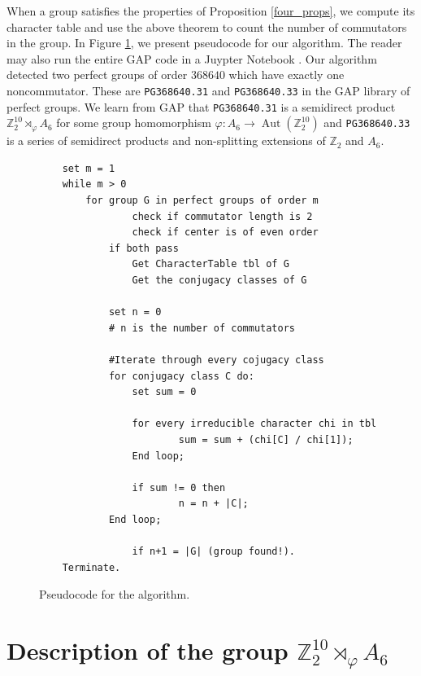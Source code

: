 \documentclass[10pt,leqno]{amsart}
\DeclareMathOperator{\Aut}{Aut}
\newcommand{\Z}{\mathbb{Z}}
\begin{document}
When a group satisfies the properties of Proposition \ref{four_props}, we compute its character table and use the above theorem to count the number of commutators in the group. In Figure \ref{fig:pseudocode}, we present pseudocode for our algorithm. The reader may also run the entire GAP code in a Juypter Notebook \cite{mycode}. Our algorithm detected two perfect groups of order $368640$ which have exactly one noncommutator. These are \verb|PG368640.31| and \verb|PG368640.33| in the GAP library of perfect groups. We learn from GAP that \verb|PG368640.31| is a semidirect product $\mathbb{Z}_2^{10} \rtimes_\varphi A_6$ for some group homomorphism $\varphi:A_6\to \Aut(\Z_2^{10})$ and \verb|PG368640.33| is a series of semidirect products and non-splitting extensions of $\Z_2$ and $A_6$.   
\begin{figure}
\begin{tcolorbox}[colback=white, colframe=black!60, title=Pseudocode for the search algorithm]
    \begin{verbatim}
    set m = 1
    while m > 0
        for group G in perfect groups of order m
                check if commutator length is 2
                check if center is of even order
            if both pass 
                Get CharacterTable tbl of G 
                Get the conjugacy classes of G
    
            set n = 0
            # n is the number of commutators
                    
            #Iterate through every cojugacy class
            for conjugacy class C do:
                set sum = 0
                
                for every irreducible character chi in tbl
                        sum = sum + (chi[C] / chi[1]);
                End loop;
    
                if sum != 0 then
                        n = n + |C|;
            End loop;
                    
                if n+1 = |G| (group found!). 
    Terminate.
    \end{verbatim} \label{alg_for_search}
\end{tcolorbox}
   \caption{Pseudocode for the algorithm.}
    \label{fig:pseudocode}
\end{figure}



\section{Description of the group $\Z_2^{10} \rtimes_\varphi A_6$}
\end{document}
